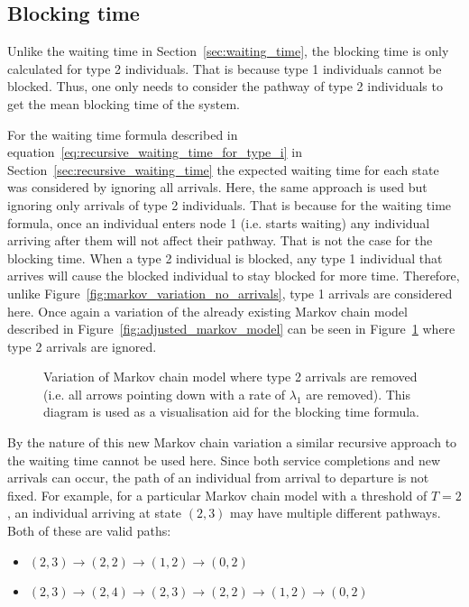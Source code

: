 \subsection{Blocking time}\label{sec:blocking_time}

Unlike the waiting time in Section~\ref{sec:waiting_time}, 
the blocking time is only calculated for type 2 individuals.
That is because type 1 individuals cannot be blocked.
Thus, one only needs to consider the pathway of type 2 individuals to get the
mean blocking time of the system.

For the waiting time formula described in
equation~\eqref{eq:recursive_waiting_time_for_type_i} in
Section~\ref{sec:recursive_waiting_time}
the expected waiting time for each state was considered by ignoring all
arrivals.
Here, the same approach is used but ignoring only arrivals of type 2
individuals.
That is because for the waiting time formula, once an individual enters
node 1 (i.e. starts waiting) any individual arriving after them will
not affect their pathway.
That is not the case for the blocking time.
When a type 2 individual is blocked, any type 1 individual that arrives will
cause the blocked individual to stay blocked for more time.
Therefore, unlike Figure~\ref{fig:markov_variation_no_arrivals}, type 1 arrivals
are considered here.
Once again a variation of the already existing Markov chain model described in
Figure~\ref{fig:adjusted_markov_model} can be seen in
Figure~\ref{fig:markov_variation_no_type_2_arrivals} where type 2 arrivals are
ignored.

\begin{figure}[ht]
    \centering
    
    \caption{Variation of Markov chain model where type 2 arrivals are removed
    (i.e. all arrows pointing down with a rate of \(\lambda_1\) are removed).
    This diagram is used as a visualisation aid for the blocking time formula.}
    \label{fig:markov_variation_no_type_2_arrivals}
\end{figure}

By the nature of this new Markov chain variation a similar recursive approach
to the waiting time cannot be used here.
Since both service completions and new arrivals can occur, the path of an
individual from arrival to departure is not fixed.
For example, for a particular Markov chain model with a threshold of \(T=2\),
an individual arriving at state \((2, 3)\) may have multiple different pathways.
Both of these are valid paths:
\begin{itemize}
    \item \((2, 3) \rightarrow (2, 2) \rightarrow (1, 2) \rightarrow (0, 2)\)
    \item \((2, 3) \rightarrow (2, 4) \rightarrow (2, 3) \rightarrow (2, 2)
    \rightarrow (1, 2) \rightarrow (0, 2)\)
\end{itemize}

